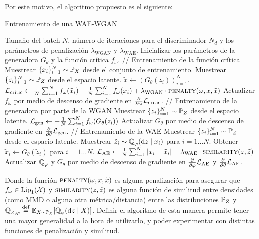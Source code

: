 Por este motivo, el algoritmo propuesto es el siguiente:

\begin{algorithm}[H]
  \caption{Entrenamiento de una WAE-WGAN}\label{alg:WAE-WGAN}
  \begin{algorithmic}[1]
    \Require Tamaño del batch $N$, número de iteraciones para el discriminador $N_d$ y los parámetros de penalización $\lambda_{\mathrm{WGAN}}$ y $\lambda_{\mathrm{WAE}}$.
    \State Inicializar los parámetros de la generadora $G_\theta$ y la función crítica $f_\omega$.
    \State // {Entrenamiento de la función crítica}
    \State Muestrear $\{x_i\}_{i=1}^{N} \sim \Prob_X$ desde el conjunto de entrenamiento.
    \State Muestrear $\{z_i\}_{i=1}^{N} \sim \Prob_Z$ desde el espacio latente.
    \State $\tilde x \gets (G_\theta(z_i))_{i=1}^{N}$.
    \State $\cL_{\mathrm{critic}} \gets
      \frac{1}{N} \sum_{i=1}^{N} f_{\omega}(\tilde x_i) - \frac{1}{N} \sum_{i=1}^{N} f_{\omega}(x_i) + \lambda_{\mathrm{WGAN}} \cdot \Call{penalty}{\omega, x, \tilde x}$
    \State Actualizar $f_{\omega}$ por medio de descenso de gradiente en $\pdv{\omega} \mathcal{L}_{\mathrm{critic}}$.
    \EndFor
    \State // {Entrenamiento de la generadora por parte de la WGAN}
    \State Muestrear $\{z_i\}_{i=1}^{N} \sim \Prob_Z$ desde el espacio latente.
    \State $\mathcal{L}_{\mathrm{gen}} \gets - \frac{1}{N}\sum_{i=1}^{N} f_\omega(G_\theta(z_i))$
    \State Actualizar $G_\theta$ por medio de descenso de gradiente en $\pdv{\theta} \mathcal{L}_{\mathrm{gen}}$.
    \State // {Entrenamiento de la WAE}
    \State Muestrear $\{z_i\}_{i=1}^{N} \sim \Prob_Z$ desde el espacio latente.
    \State Muestrear $\tilde z_i \sim \ProbQ_\varphi(\dd z \mid x_i)$ para $i=1\dots N$.
    \State Obtener $\tilde x_i \gets G_\theta(\tilde z_i)$ para $i=1\dots N$.
    \State $\cL_{\mathrm{AE}} \gets \frac{1}{N}\sum_{i=1}^{N} |x_i - \tilde x_i| + \lambda_{\mathrm{WAE}} \cdot \Call{similarity}{z, \tilde z}$
    \State Actualizar $\ProbQ_\varphi$ y $G_\theta$ por medio de descenso de gradiente en $\pdv{\varphi} \cL_{\mathrm{AE}}$ y $\pdv{\theta} \mathcal{L}_{\mathrm{AE}}$.
    \EndWhile
  \end{algorithmic}
\end{algorithm}

Donde la función $\Call{penalty}{\omega, x, \tilde x}$ es alguna penalización para asegurar que $f_\omega\in \Lip_1(\cX)$ y $\Call{similarity}{z, \tilde z}$ es alguna función de similitud entre densidades (como MMD o alguna otra métrica/distancia) entre las distribuciones $\Prob_Z$ y $\ProbQ_{Z, \varphi} \eqdef \Exp_{X\sim \Prob_X}[\ProbQ_\varphi(\dd z \mid X)]$. Definir el algoritmo de esta manera permite tener una mayor generalidad a la hora de utilizarlo, y poder experimentar con distintas funciones de penalización y similitud.

